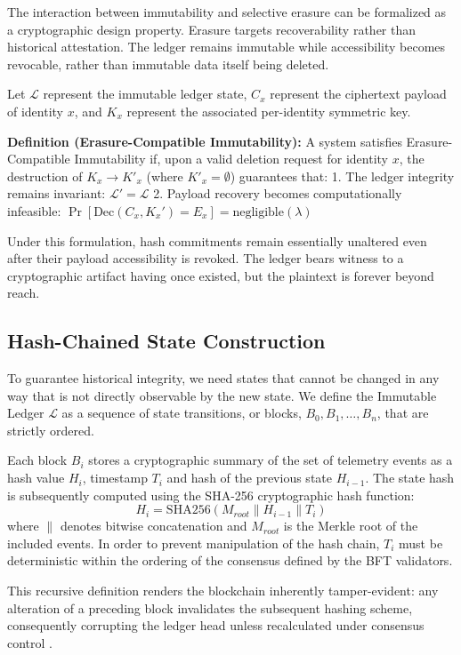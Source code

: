 \documentclass[conference]{IEEEtran}
\begin{document}
The interaction between immutability and selective erasure can be formalized as a cryptographic design property. Erasure targets recoverability rather than historical attestation. The ledger remains immutable while accessibility becomes revocable, rather than immutable data itself being deleted.

Let $\mathcal{L}$ represent the immutable ledger state, $C_x$ represent the ciphertext payload of identity $x$, and $K_x$ represent the associated per-identity symmetric key. 

\textbf{Definition (Erasure-Compatible Immutability):} A system satisfies Erasure-Compatible Immutability if, upon a valid deletion request for identity $x$, the destruction of $K_x \to K'_x$ (where $K'_x = \emptyset$) guarantees that:
1. The ledger integrity remains invariant: $\mathcal{L}' = \mathcal{L}$
2. Payload recovery becomes computationally infeasible: $\Pr[\text{Dec}(C_x, K_x') = E_x] = \text{negligible}(\lambda)$

Under this formulation, hash commitments remain essentially unaltered even after their payload accessibility is revoked. The ledger bears witness to a cryptographic artifact having once existed, but the plaintext is forever beyond reach.

\subsection{Hash-Chained State Construction}
To guarantee historical integrity, we need states that cannot be changed in any way that is not directly observable by the new state. We define the Immutable Ledger $\mathcal{L}$ as a sequence of state transitions, or blocks, $B_0, B_1, \dots, B_n$, that are strictly ordered.

Each block $B_i$ stores a cryptographic summary of the set of telemetry events as a hash value $H_i$, timestamp $T_i$ and hash of the previous state $H_{i-1}$. The state hash is subsequently computed using the SHA-256 cryptographic hash function:
\begin{equation}
H_i = \text{SHA256}( M_{root} \parallel H_{i-1} \parallel T_i )
\end{equation}
where $\parallel$ denotes bitwise concatenation and $M_{root}$ is the Merkle root of the included events. In order to prevent manipulation of the hash chain, $T_i$ must be deterministic within the ordering of the consensus defined by the BFT validators.

This recursive definition renders the blockchain inherently tamper-evident: any alteration of a preceding block invalidates the subsequent hashing scheme, consequently corrupting the ledger head unless recalculated under consensus control \cite{b18}.
\end{document}
